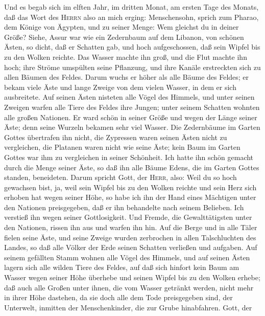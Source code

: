  Und es begab sich im elften Jahr, im dritten Monat, am
ersten Tage des Monats, daß das Wort des \textsc{Herrn} also an mich
erging:  Menschensohn, sprich zum Pharao, dem Könige von
Ägypten, und zu seiner Menge: Wem gleichst du in deiner Größe?
 Siehe, Assur war wie ein Zedernbaum auf dem Libanon, von
schönen Ästen, so dicht, daß er Schatten gab, und hoch aufgeschossen,
daß sein Wipfel bis zu den Wolken reichte.  Das Wasser
machte ihn groß, und die Flut machte ihn hoch; ihre Ströme umspülten
seine Pflanzung, und ihre Kanäle erstreckten sich zu allen Bäumen des
Feldes.  Darum wuchs er höher als alle Bäume des Feldes;
er bekam viele Äste und lange Zweige von dem vielen Wasser, in dem er
sich ausbreitete.  Auf seinen Ästen nisteten alle Vögel
des Himmels, und unter seinen Zweigen warfen alle Tiere des Feldes ihre
Jungen; unter seinem Schatten wohnten alle großen Nationen.
 Er ward schön in seiner Größe und wegen der Länge seiner
Äste; denn seine Wurzeln bekamen sehr viel Wasser.  Die
Zedernbäume im Garten Gottes übertrafen ihn nicht, die Zypressen waren
seinen Ästen nicht zu vergleichen, die Platanen waren nicht wie seine
Äste; kein Baum im Garten Gottes war ihm zu vergleichen in seiner
Schönheit.  Ich hatte ihn schön gemacht durch die Menge
seiner Äste, so daß ihn alle Bäume Edens, die im Garten Gottes standen,
beneideten.  Darum spricht Gott, der \textsc{Herr}, also:
Weil du so hoch gewachsen bist, ja, weil sein Wipfel bis zu den Wolken
reichte und sein Herz sich erhoben hat wegen seiner Höhe,
 so habe ich ihn der Hand eines Mächtigen unter den
Nationen preisgegeben, daß er ihn behandelte nach seinem Belieben. Ich
verstieß ihn wegen seiner Gottlosigkeit.  Und Fremde, die
Gewalttätigsten unter den Nationen, rissen ihn aus und warfen ihn hin.
Auf die Berge und in alle Täler fielen seine Äste, und seine Zweige
wurden zerbrochen in allen Talschluchten des Landes, so daß alle Völker
der Erde seinen Schatten verließen und aufgaben.  Auf
seinem gefällten Stamm wohnen alle Vögel des Himmels, und auf seinen
Ästen lagern sich alle wilden Tiere des Feldes,  auf daß
sich hinfort kein Baum am Wasser wegen seiner Höhe überhebe und seinen
Wipfel bis zu den Wolken erhebe; daß auch alle Großen unter ihnen, die
vom Wasser getränkt werden, nicht mehr in ihrer Höhe dastehen, da sie
doch alle dem Tode preisgegeben sind, der Unterwelt, inmitten der
Menschenkinder, die zur Grube hinabfahren.  Gott, der
